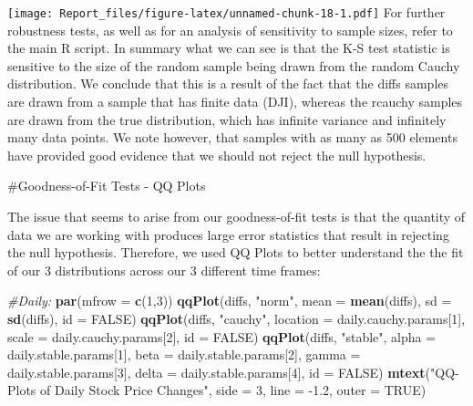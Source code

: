\documentclass[]{article}
\newenvironment{Shaded}{\begin{snugshade}}{\end{snugshade}}
\newcommand{\CommentTok}[1]{\textcolor[rgb]{0.56,0.35,0.01}{\textit{#1}}}
\newcommand{\DataTypeTok}[1]{\textcolor[rgb]{0.13,0.29,0.53}{#1}}
\newcommand{\DecValTok}[1]{\textcolor[rgb]{0.00,0.00,0.81}{#1}}
\newcommand{\FloatTok}[1]{\textcolor[rgb]{0.00,0.00,0.81}{#1}}
\newcommand{\KeywordTok}[1]{\textcolor[rgb]{0.13,0.29,0.53}{\textbf{#1}}}
\newcommand{\NormalTok}[1]{#1}
\newcommand{\OtherTok}[1]{\textcolor[rgb]{0.56,0.35,0.01}{#1}}
\newcommand{\StringTok}[1]{\textcolor[rgb]{0.31,0.60,0.02}{#1}}
\begin{document}
\texttt{[image: Report\_files/figure-latex/unnamed-chunk-18-1.pdf]} For
further robustness tests, as well as for an analysis of sensitivity to
sample sizes, refer to the main R script. In summary what we can see is
that the K-S test statistic is sensitive to the size of the random
sample being drawn from the random Cauchy distribution. We conclude that
this is a result of the fact that the diffs samples are drawn from a
sample that has finite data (DJI), whereas the rcauchy samples are drawn
from the true distribution, which has infinite variance and infinitely
many data points. We note however, that samples with as many as 500
elements have provided good evidence that we should not reject the null
hypothesis.

\#Goodness-of-Fit Tests - QQ Plots

The issue that seems to arise from our goodness-of-fit tests is that the
quantity of data we are working with produces large error statistics
that result in rejecting the null hypothesis. Therefore, we used QQ
Plots to better understand the the fit of our 3 distributions across our
3 different time frames:

\begin{Shaded}
\begin{Highlighting}[]
\CommentTok{#Daily:}
\KeywordTok{par}\NormalTok{(}\DataTypeTok{mfrow =} \KeywordTok{c}\NormalTok{(}\DecValTok{1}\NormalTok{,}\DecValTok{3}\NormalTok{))}
\KeywordTok{qqPlot}\NormalTok{(diffs, }\StringTok{"norm"}\NormalTok{, }\DataTypeTok{mean =} \KeywordTok{mean}\NormalTok{(diffs), }\DataTypeTok{sd =} \KeywordTok{sd}\NormalTok{(diffs), }\DataTypeTok{id =} \OtherTok{FALSE}\NormalTok{) }
\KeywordTok{qqPlot}\NormalTok{(diffs, }\StringTok{"cauchy"}\NormalTok{, }\DataTypeTok{location =}\NormalTok{ daily.cauchy.params[}\DecValTok{1}\NormalTok{], }\DataTypeTok{scale =}\NormalTok{ daily.cauchy.params[}\DecValTok{2}\NormalTok{], }\DataTypeTok{id =} \OtherTok{FALSE}\NormalTok{)}
\KeywordTok{qqPlot}\NormalTok{(diffs, }\StringTok{"stable"}\NormalTok{, }\DataTypeTok{alpha =}\NormalTok{ daily.stable.params[}\DecValTok{1}\NormalTok{], }\DataTypeTok{beta =}\NormalTok{ daily.stable.params[}\DecValTok{2}\NormalTok{], }\DataTypeTok{gamma =}\NormalTok{ daily.stable.params[}\DecValTok{3}\NormalTok{], }\DataTypeTok{delta =}\NormalTok{ daily.stable.params[}\DecValTok{4}\NormalTok{], }\DataTypeTok{id =} \OtherTok{FALSE}\NormalTok{)}
\KeywordTok{mtext}\NormalTok{(}\StringTok{"QQ-Plots of Daily Stock Price Changes"}\NormalTok{, }\DataTypeTok{side =} \DecValTok{3}\NormalTok{, }\DataTypeTok{line =} \FloatTok{-1.2}\NormalTok{, }\DataTypeTok{outer =} \OtherTok{TRUE}\NormalTok{)}
\end{Highlighting}
\end{Shaded}
\end{document}
